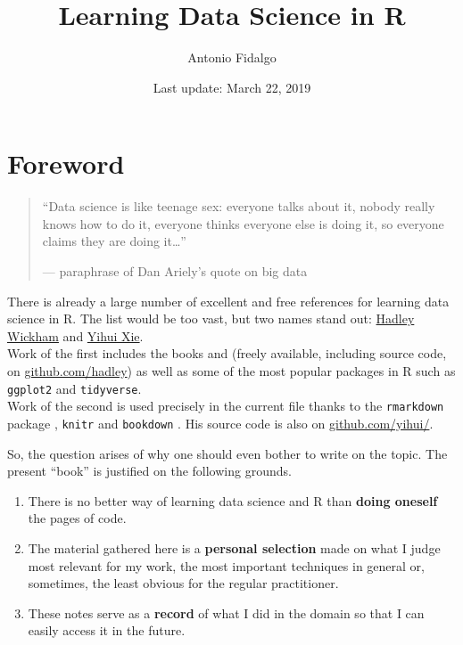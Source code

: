 \documentclass[]{book}
\title{Learning Data Science in R}
\author{Antonio Fidalgo}
\date{Last update: March 22, 2019}
\providecommand{\tightlist}{%
  \setlength{\itemsep}{0pt}\setlength{\parskip}{0pt}}
\theoremstyle{definition}
\theoremstyle{definition}
\theoremstyle{definition}
\theoremstyle{remark}
\begin{document}
\maketitle

{
\setcounter{tocdepth}{1}
\tableofcontents
}
\hypertarget{foreword}{%
\chapter*{Foreword}\label{foreword}}

\begin{quote}
``Data science is like teenage sex: everyone talks about it, nobody
really knows how to do it, everyone thinks everyone else is doing it, so
everyone claims they are doing it\ldots{}''

--- paraphrase of Dan Ariely's quote on big data
\end{quote}

There is already a large number of excellent and free references for
learning data science in R. The list would be too vast, but two names
stand out: \href{http://hadley.nz/}{Hadley Wickham} and
\href{https://yihui.name/en/about/}{Yihui Xie}.\\
Work of the first includes the books \citet{wickham2016} and
\citet{wickham2014} (freely available, including source code, on
\href{https://github.com/hadley}{github.com/hadley}) as well as some of
the most popular packages in R such as \texttt{ggplot2}
\citep{R-ggplot2} and \texttt{tidyverse}\citep{R-tidyverse}.\\
Work of the second is used precisely in the current file thanks to the
\texttt{rmarkdown} package \citep{R-rmarkdown}, \texttt{knitr}
\citep{R-knitr} and \texttt{bookdown} \citep{R-bookdown}. His source
code is also on \href{https://github.com/yihui/}{github.com/yihui/}.

So, the question arises of why one should even bother to write on the
topic. The present ``book'' is justified on the following grounds.

\begin{enumerate}
\def\labelenumi{\arabic{enumi}.}
\tightlist
\item
  There is no better way of learning data science and R than
  \textbf{doing oneself} the pages of code.\\
\item
  The material gathered here is a \textbf{personal selection} made on
  what I judge most relevant for my work, the most important techniques
  in general or, sometimes, the least obvious for the regular
  practitioner.\\
\item
  These notes serve as a \textbf{record} of what I did in the domain so
  that I can easily access it in the future.
\end{enumerate}
\end{document}
